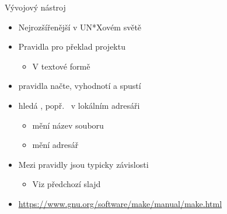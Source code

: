 \begin{frame}{Vývojový nástroj \make}

  \begin{itemize}
    \item Nejrozšířenější v UN*Xovém světě

    \pause

    \item Pravidla pro překlad projektu
    \begin{itemize}
      \item V textové formě
    \end{itemize}

    \pause

    \item {} pravidla načte, vyhodnotí a spustí

    \pause

    \item {} hledá , popř.\  v lokálním
      adresáři
    \begin{itemize}
      \item {} mění název souboru
      \item {} mění adresář
    \end{itemize}

    \pause

    \item Mezi pravidly jsou typicky závislosti
    \begin{itemize}
      \item Viz předchozí slajd
    \end{itemize}

    \pause

    \item \url{https://www.gnu.org/software/make/manual/make.html}
  \end{itemize}

\end{frame}

